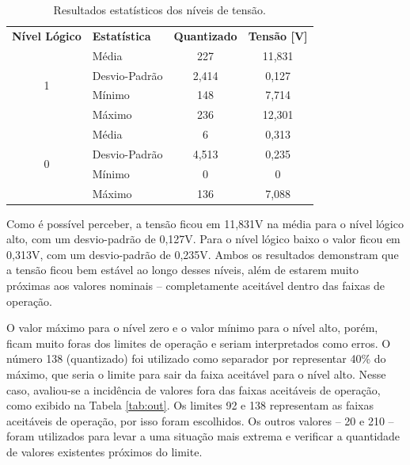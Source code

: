 \begin{table}[htb]
\centering
\caption{Resultados estatísticos dos níveis de tensão.}
\label{tab:stats}
\begin{tabular}{clcc}
\textbf{Nível Lógico} & \textbf{Estatística} & \textbf{Quantizado} & \textbf{Tensão {[}V{]}} \\
\multirow{4}{*}{1}    & Média                & 227                 & 11,831                  \\
                      & Desvio-Padrão        & 2,414               & 0,127                   \\
                      & Mínimo               & 148                 & 7,714                   \\
                      & Máximo               & 236                 & 12,301                  \\
\multirow{4}{*}{0}    & Média                & 6                   & 0,313                   \\
                      & Desvio-Padrão        & 4,513               & 0,235                   \\
                      & Mínimo               & 0                   & 0                       \\
                      & Máximo               & 136                 & 7,088                  
\end{tabular}
\end{table}

Como é possível perceber, a tensão ficou em 11,831V na média para o nível lógico alto, com um desvio-padrão de 0,127V. Para o nível lógico baixo o valor ficou em 0,313V, com um desvio-padrão de 0,235V. Ambos os resultados demonstram que a tensão ficou bem estável ao longo desses níveis, além de estarem muito próximas aos valores nominais -- completamente aceitável dentro das faixas de operação.

O valor máximo para o nível zero e o valor mínimo para o nível alto, porém, ficam muito foras dos limites de operação e seriam interpretados como erros. O número 138 (quantizado) foi utilizado como separador por representar 40\% do máximo, que seria o limite para sair da faixa aceitável para o nível alto. Nesse caso, avaliou-se a incidência de valores fora das faixas aceitáveis de operação, como exibido na Tabela \ref{tab:out}. Os limites 92 e 138 representam as faixas aceitáveis de operação, por isso foram escolhidos. Os outros valores -- 20 e 210 -- foram utilizados para levar a uma situação mais extrema e verificar a quantidade de valores existentes próximos do limite.

